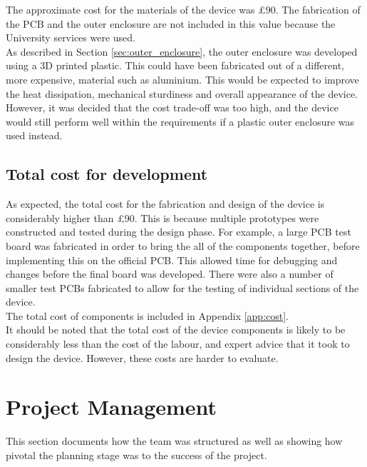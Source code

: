 \documentclass[a4paper,12pt]{article}
\begin{document}
The approximate cost for the materials of the device was \pounds90. The fabrication of the PCB and the outer enclosure are not included in this value because the University services were used. \\

As described in Section \ref{sec:outer_enclosure}, the outer enclosure was developed using a 3D printed plastic. This could have been fabricated out of a different, more expensive, material such as aluminium. This would be expected to improve the heat dissipation, mechanical sturdiness and overall appearance of the device. However, it was decided that the cost trade-off was too high, and the device would still perform well within the requirements if a plastic outer enclosure was used instead.

\subsection{Total cost for development}
\label{sec:total_cost}

As expected, the total cost for the fabrication and design of the device is considerably higher than \pounds90. This is because multiple prototypes were constructed and tested during the design phase. For example, a large PCB test board was fabricated in order to bring the all of the components together, before implementing this on the official PCB. This allowed time for debugging and changes before the final board was developed. There were also a number of smaller test PCBs fabricated to allow for the testing of individual sections of the device. \\

The total cost of components is included in Appendix \ref{app:cost}. \\

It should be noted that the total cost of the device components is  likely to be considerably less than the cost of the labour, and expert advice that it took to design the device. However, these costs are harder to evaluate.


\newpage
\section{Project Management}
\label{sec:project_management}

This section documents how the team was structured as well as showing how pivotal the planning stage was to the success of the project.
\end{document}
